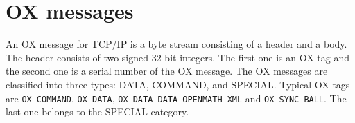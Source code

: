 
\section{OX messages}

An OX message for TCP/IP is a byte stream consisting of
a header and a body.
The header consists of two signed 32 bit integers.
The first one is an OX tag 
and the second one is a serial number of the OX message.
The OX messages are classified into three types:
DATA, COMMAND, and SPECIAL.
Typical OX tags are 
\verb+OX_COMMAND+, \verb+OX_DATA+, \verb+OX_DATA_DATA_OPENMATH_XML+
and \verb+OX_SYNC_BALL+. The last one belongs to the SPECIAL category.



%
